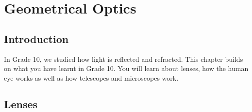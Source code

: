 \chapter{Geometrical Optics}
\label{p:wsl:go11}

\section{Introduction}
In Grade 10, we studied how light is reflected and refracted. This chapter builds on what you have learnt in Grade 10. You will learn about lenses, how the human eye works as well as how telescopes and microscopes work.

\section{Lenses}

